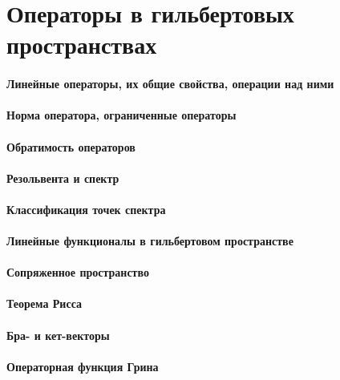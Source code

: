 \documentclass[russian,twocolumn]{article}
\begin{document}
\section{Операторы в гильбертовых пространствах}

\paragraph{Линейные операторы, их общие свойства, операции над ними}

\paragraph{Норма оператора, ограниченные операторы}

\paragraph{Обратимость операторов}

\paragraph{Резольвента и спектр}

\paragraph{Классификация точек спектра}

\paragraph{Линейные функционалы в гильбертовом пространстве}

\paragraph{Сопряженное пространство}

\paragraph{Теорема Рисса}

\paragraph{Бра- и кет-векторы}

\paragraph{Операторная функция Грина}
\end{document}
